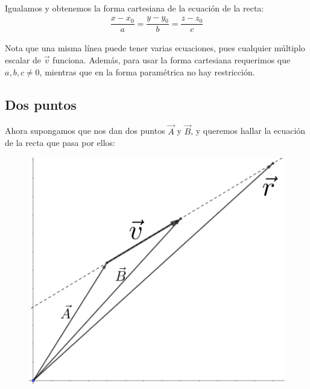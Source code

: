 \documentclass[12pt, fleqn]{report}                             %
\theoremstyle{break}                                            %
\begin{document}
            Igualamos y obtenemos la forma cartesiana de la ecuación de la recta:
            \begin{align}
                \dfrac{x - x_0}{a} = \dfrac{y - y_0}{b} = \dfrac{z - z_0}{c} \label{lineEquation1}
            \end{align}
            
            Nota que una misma línea puede tener varias ecuaciones, pues cualquier múltiplo escalar de $\vec{v}$ funciona. Además, para usar la forma cartesiana requerimos que $a,b,c\neq 0$, mientras que en la forma paramétrica no hay restricción.
            
            
            \subsection{Dos puntos}
            
            Ahora supongamos que nos dan dos puntos $\vec{A}$ y $\vec{B}$, y queremos hallar la ecuación de la recta que pasa por ellos:
            
            \begin{figure}[H]
                \centering
                \includegraphics[scale=1.2]{line2.png}
            \end{figure}
        
\end{document}
